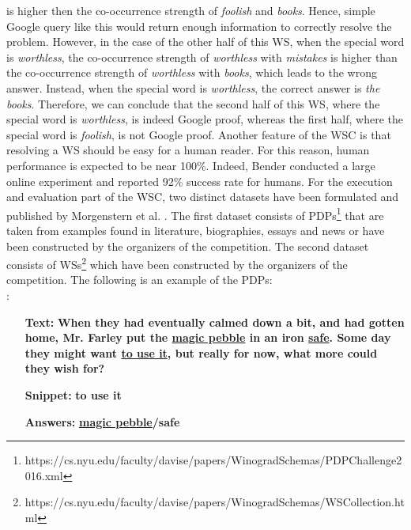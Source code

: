is higher then the co-occurrence strength of \textit{foolish} and \textit{books}. Hence, simple Google query like this would return enough information to correctly resolve the problem.
However, in the case of the other half of this WS, when the special word is \textit{worthless}, the co-occurrence strength of \textit{worthless} with \textit{mistakes} is higher than the co-occurrence strength of \textit{worthless} with \textit{books}, which leads to the wrong answer. Instead, when the special word is \textit{worthless}, the correct answer is \textit{the books}. 
Therefore, we can conclude that the second half of this WS, where the special word is \textit{worthless}, is indeed Google proof, whereas the first half, where the special word is \textit{foolish}, is not Google proof.
Another feature of the WSC is that resolving a WS should be easy for a human reader. For this reason, human performance is expected to be near 100\%. Indeed, Bender \cite{DBLP:conf/maics/Bender15} conducted a large online experiment and reported 92\% success rate for humans. 
For the execution and evaluation part of the WSC, two distinct datasets have been formulated and published by Morgenstern et al. \cite{DBLP:journals/aim/MorgensternDO16}.
The first dataset consists of PDPs\footnote{https://cs.nyu.edu/faculty/davise/papers/WinogradSchemas/PDPChallenge2016.xml} that are taken from examples found in literature, biographies, essays and news or have been constructed by the organizers of the competition. 
The second dataset consists of WSs\footnote{https://cs.nyu.edu/faculty/davise/papers/WinogradSchemas/WSCollection.html} which have been constructed by the organizers of the competition.
The following is an example of the PDPs:\\
:

\begin{itemize}[align=left] 
	\item [\textbf{Text:}] \textbf{When they had eventually calmed down a bit, and had gotten home, Mr. Farley put the \underline{magic pebble} in an iron \underline{safe}. Some day they might want \underline{to use it}, but really for now, what more could they wish for?}
	
	\item [\textbf{Snippet:}] \textbf{to use it}
	\item [\textbf{Answers:}] \textbf{\underline{magic pebble}/safe}

\end{itemize}

